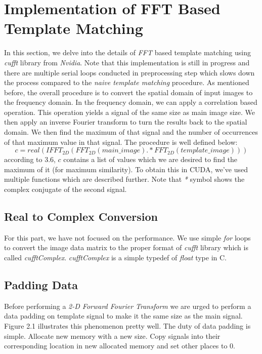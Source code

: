 \section{Implementation of FFT Based Template Matching}
In this section, we delve into the details of \textit{FFT} based template matching using \textit{cufft} library from \textit{Nvidia}. Note that this implementation is still in progress and there are multiple serial loops conducted in preprocessing step which slows down the process compared to the \textit{naive template matching} procedure.
As mentioned before, the overall procedure is to convert the spatial domain of input images to the frequency domain. In the frequency domain, we can apply a correlation based operation. This operation yields a signal of the same size as main image size. We then apply an inverse Fourier transform to turn the results back to the spatial domain. We then find the maximum of that signal and the number of occurrences of that maximum value in that signal. The procedure is well defined below\cite{gonzalez}:
\begin{equation}
	c = real(IFFT_{2D} (FFT_{2D}(main\_image) .* FFT_{2D}(template\_image)))
\end{equation}	
according to 3.6, $c$ contains a list of values which we are desired to find the maximum of it (for maximum similarity). To obtain this in CUDA, we've used multiple functions which are described further. Note that \textit{*} symbol shows the complex conjugate of the second signal.

\subsection{Real to Complex Conversion}
For this part, we have not focused on the performance. We use simple \textit{for} loops to convert the image data matrix to the proper format of \textit{cufft} library which is called \textit{cufftComplex}. \textit{cufftComplex} is a simple typedef of \textit{float} type in C.

\subsection{Padding Data}
Before performing a \textit{2-D Forward Fourier Transform} we are urged to perform a data padding on template signal to make it the same size as the main signal. Figure 2.1 illustrates this phenomenon pretty well. The duty of data padding is simple. Allocate new memory with a new size. Copy signals into their corresponding location in new allocated memory and set other places to 0.

